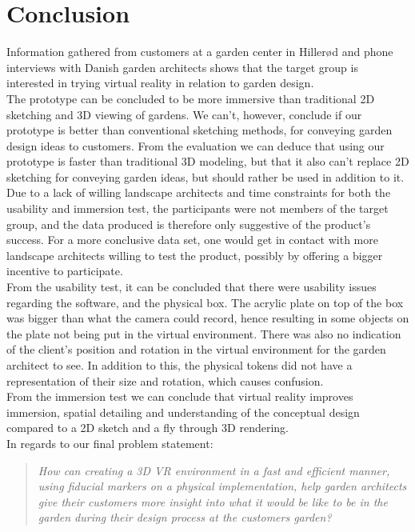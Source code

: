 \chapter{Conclusion}
Information gathered from customers at a garden center in Hillerød and phone interviews with Danish garden architects shows that the target group is interested in trying virtual reality in relation to garden design.\\

The prototype can be concluded to be more immersive than traditional 2D sketching and 3D viewing of gardens. We can't, however, conclude if our prototype is better than conventional sketching methods, for conveying garden design ideas to customers. From the evaluation we can deduce that using our prototype is faster than traditional 3D modeling, but that it also can't replace 2D sketching for conveying garden ideas, but should rather be used in addition to it.\\

Due to a lack of willing landscape architects and time constraints for both the usability and immersion test, the participants were not members of the target group, and the data produced is therefore only suggestive of the product's success. For a more conclusive data set, one would get in contact with more landscape architects willing to test the product, possibly by offering a bigger incentive to participate.\\

From the usability test, it can be concluded that there were usability issues regarding the software, and the physical box. The acrylic plate on top of the box was bigger than what the camera could record, hence resulting in some objects on the plate not being put in the virtual environment. There was also no indication of the client's position and rotation in the virtual environment for the garden architect to see. In addition to this, the physical tokens did not have a representation of their size and rotation, which causes confusion.\\


From the immersion test we can conclude that virtual reality improves immersion, spatial detailing and understanding of the conceptual design compared to a 2D sketch and a fly through 3D rendering.\\

In regards to our final problem statement:\\
\begin{quote}
	\textit{How can creating a 3D VR environment in a fast and efficient manner, using fiducial markers on a physical implementation, help garden architects give their customers more insight into what it would be like to be in the garden during their design process at the customers garden?}\\
\end{quote}

